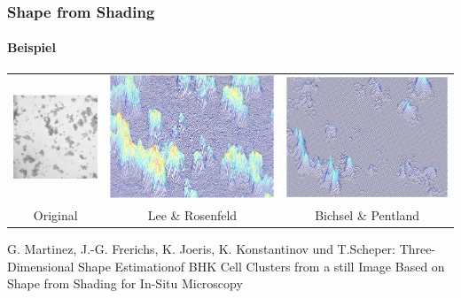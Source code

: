 \documentclass{beamer}
\begin{document}
\begin{frame}
	\frametitle{Shape from Shading}
	\framesubtitle{Beispiel}
	\begin{center}
	
	\begin{tabular}{ccc}
		\includegraphics[width=0.3\linewidth]{includes/bhk_original} &
		\includegraphics[width=0.3\linewidth]{includes/bhk_lee_rosenfeld} &
		\includegraphics[width=0.3\linewidth]{includes/bhk_binsel_pentland} \\
		Original &
		Lee \& Rosenfeld &
		Bichsel \& Pentland
	\end{tabular}
	\end{center}
	
	\vspace{4em}
	\tiny
	G. Martinez, J.-G. Frerichs, K. Joeris, K. Konstantinov und T.Scheper: Three-Dimensional Shape Estimationof BHK Cell Clusters from a still Image Based on Shape from Shading for In-Situ Microscopy
\end{frame}
\end{document}
